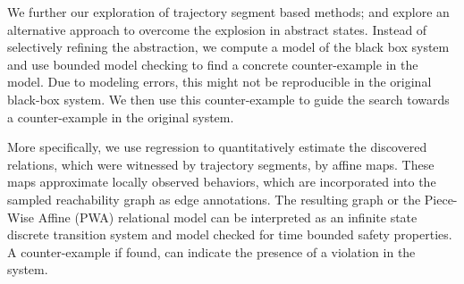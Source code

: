 We further our exploration of trajectory segment based methods; and
explore an alternative approach to overcome the explosion in abstract
states. Instead of selectively refining the abstraction, we compute a
model of the black box system and use bounded model checking to find a
concrete counter-example in the model. Due to modeling errors, this
might not be reproducible in the original black-box system. We then
use this counter-example to guide the search towards a counter-example
in the original system.

More specifically, we use regression to quantitatively estimate the
discovered relations, which were witnessed by trajectory segments, by
affine maps. These maps approximate locally observed behaviors, which
are incorporated into the sampled reachability graph as edge
annotations.  The resulting graph or the Piece-Wise Affine (PWA)
relational model can be interpreted as an infinite state discrete
transition system and model checked for time bounded safety
properties. A counter-example if found, can indicate the presence of a
violation in the system.





